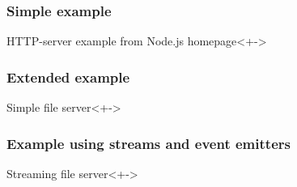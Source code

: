 \begin{frame}
	\frametitle{Simple example}
	\begin{block}{HTTP-server example from Node.js homepage}<+->
		
	\end{block}
\end{frame}


\begin{frame}
	\frametitle{Extended example}
	\begin{block}{Simple file server}<+->
		
	\end{block}
\end{frame}


\begin{frame}
	\frametitle{Example using streams and event emitters}
	\begin{block}{Streaming file server}<+->
		
	\end{block}
\end{frame}


